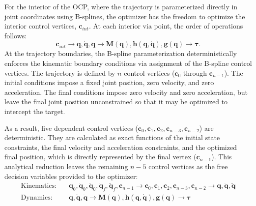 For the interior of the \ac{OCP}, where the trajectory is parameterized directly in joint coordinates using B-splines, the optimizer has the freedom to optimize the interior control vertices, $\mathbf{c}_{int}$. 
At each interior via point, the order of operations follows:
\begin{equation}
    \boxed{ \mathbf{c}_{int} \longrightarrow 
    \mathbf{q}, \dot{\mathbf{q}}, \ddot{\mathbf{q}} \longrightarrow 
    \mathbf{M}(\mathbf{q}), \mathbf{h}(\mathbf{q},\dot{\mathbf{q}}), \mathbf{g}(\mathbf{q}) \longrightarrow \boldsymbol{\tau}}.
    \nonumber
\end{equation}
At the trajectory boundaries, the B-spline parameterization deterministically enforces the kinematic boundary conditions via assignment of the B-spline control vertices. 
The trajectory is defined by $n$ control vertices ($\mathbf{c}_0$ through $\mathbf{c}_{n-1}$). 
The initial conditions impose a fixed joint position, zero velocity, and zero acceleration. 
The final conditions impose zero velocity and zero acceleration, but leave the final joint position unconstrained so that it may be optimized to intercept the target.

As a result, five dependent control vertices ($\mathbf{c}_0, \mathbf{c}_1, \mathbf{c}_2, \mathbf{c}_{n-3}, \mathbf{c}_{n-2}$) are deterministic. 
They are calculated as exact functions of the initial state constraints, the final velocity and acceleration constraints, and the optimized final position, which is directly represented by the final vertex ($\mathbf{c}_{n-1}$). 
This analytical reduction leaves the remaining $n-5$ control vertices as the free decision variables provided to the optimizer:
\begin{equation}
    \begin{aligned}
        \text{Kinematics:} \quad & \boxed{ \mathbf{q}_0, \dot{\mathbf{q}}_0, \ddot{\mathbf{q}}_0, \dot{\mathbf{q}}_f, \ddot{\mathbf{q}}_f, \mathbf{c}_{n-1} \longrightarrow 
        \mathbf{c}_0, \mathbf{c}_1, \mathbf{c}_2, \mathbf{c}_{n-3}, \mathbf{c}_{n-2} \longrightarrow 
        \mathbf{q}, \dot{\mathbf{q}}, \ddot{\mathbf{q}} } \\
        \text{Dynamics:} \quad & \boxed{ \mathbf{q}, \dot{\mathbf{q}}, \ddot{\mathbf{q}} \longrightarrow 
        \mathbf{M}(\mathbf{q}), \mathbf{h}(\mathbf{q},\dot{\mathbf{q}}), \mathbf{g}(\mathbf{q}) \longrightarrow 
        \boldsymbol{\tau} }
    \end{aligned}
    \nonumber
\end{equation}

